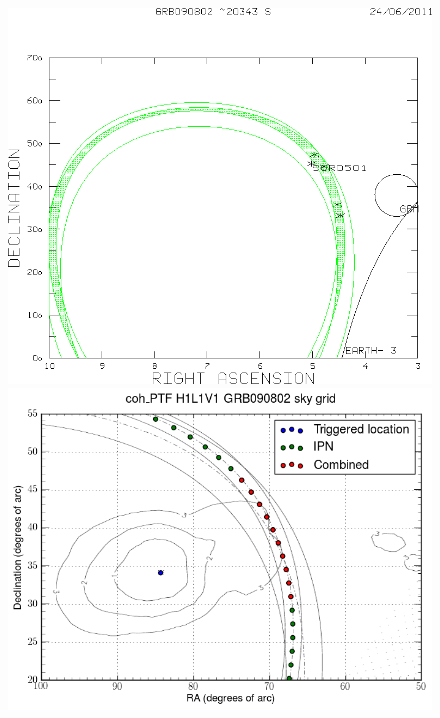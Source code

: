 \begin{figure}[ht!]
\begin{minipage}{0.5\linewidth}
\includegraphics[scale=0.35]{Images/090802EB_IPN.png}
\end{minipage}
\hspace{0.5cm}
\begin{minipage}{0.5\linewidth}
\centering
\includegraphics[scale=0.41]{Images/090802_eb.png}
\end{minipage}

\end{figure}
